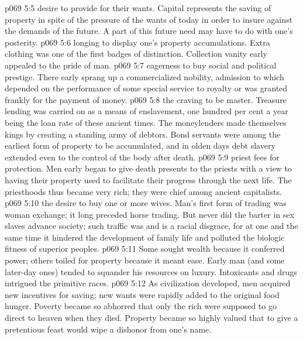 \pc \vs p069 5:5 \bibnobreakspace {}desire to provide for their wants. Capital represents the saving of property in spite of the pressure of the wants of today in order to insure against the demands of the future. A part of this future need may have to do with one’s posterity.
\pc \vs p069 5:6 \bibnobreakspace {}longing to display one’s property accumulations. Extra clothing was one of the first badges of distinction. Collection vanity early appealed to the pride of man.
\pc \vs p069 5:7 \bibnobreakspace {}eagerness to buy social and political prestige. There early sprang up a commercialized nobility, admission to which depended on the performance of some special service to royalty or was granted frankly for the payment of money.
\pc \vs p069 5:8 \bibnobreakspace {}the craving to be master. Treasure lending was carried on as a means of enslavement, one hundred per cent a year being the loan rate of these ancient times. The moneylenders made themselves kings by creating a standing army of debtors. Bond servants were among the earliest form of property to be accumulated, and in olden days debt slavery extended even to the control of the body after death.
\pc \vs p069 5:9 \bibnobreakspace {}priest fees for protection. Men early began to give death presents to the priests with a view to having their property used to facilitate their progress through the next life. The priesthoods thus became very rich; they were chief among ancient capitalists.
\pc \vs p069 5:10 \bibnobreakspace {}the desire to buy one or more wives. Man’s first form of trading was woman exchange; it long preceded horse trading. But never did the barter in sex slaves advance society; such traffic was and is a racial disgrace, for at one and the same time it hindered the development of family life and polluted the biologic fitness of superior peoples.
\pc \vs p069 5:11 \bibnobreakspace {} Some sought wealth because it conferred power; others toiled for property because it meant ease. Early man (and some later\hyp{}day ones) tended to squander his resources on luxury. Intoxicants and drugs intrigued the primitive races.
\pc \vs p069 5:12 As civilization developed, men acquired new incentives for saving; new wants were rapidly added to the original food hunger. Poverty became so abhorred that only the rich were supposed to go direct to heaven when they died. Property became so highly valued that to give a pretentious feast would wipe a dishonor from one’s name.
